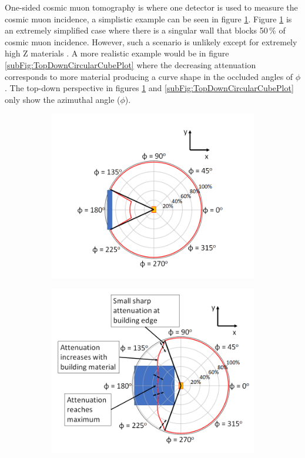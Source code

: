  One-sided cosmic muon tomography is where one detector is used to measure the cosmic muon incidence, a simplistic example can be seen in figure \ref{subFig:TopDownCircularWallPlot}. Figure \ref{subFig:TopDownCircularWallPlot} is an extremely simplified case where there is a singular wall that blocks 50\,\% of cosmic muon incidence. However, such a scenario is unlikely except for extremely high Z materials \cite{schultz_2007}. A more realistic example would be in figure \ref{subFig:TopDownCircularCubePlot} where the decreasing attenuation corresponds to more material producing a curve shape in the occluded angles of $\phi$. The top-down perspective in figures \ref{subFig:TopDownCircularWallPlot} and \ref{subFig:TopDownCircularCubePlot} only show the azimuthal angle ($\phi$). 
 
 \begin{figure}[!h]
\centering
\begin{subfigure}{.5\textwidth}
  \centering
  \includegraphics[width=\linewidth]{Chapter5/Figs/topDownWallPhiRedo.png}
  \captionsetup{width=.9\linewidth}
  \caption{}
  \label{subFig:TopDownCircularWallPlot}
\end{subfigure}%
\begin{subfigure}{.5\textwidth}
  \centering
\includegraphics[width=\linewidth]{Chapter5/Figs/topDownCubePhiRedo.png}

\end{subfigure}
\end{figure}

